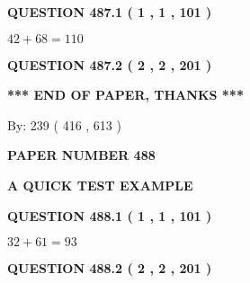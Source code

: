 \documentclass[12pt]{article}
\begin{document}
\vspace{0.2in}
  
{\textbf{\Large{QUESTION
487.1 
 ( 1 , 1 , 101 )
}}}
  
  
 
 

$ %
42 +  %
68=   %
110$
 
 
  
\vspace{0.2in}
  
{\textbf{\Large{QUESTION
487.2 
 ( 2 , 2 , 201 )
}}}
  
  
   
   
 \vspace{0.2in}
 
   
   
   
   
\vspace{1.0in} 
{\textbf{\large{ *** END OF PAPER, THANKS *** }}} 
   
   
\hspace{1.0in} By: 
 239 ( 416 ,  613 )
   
   
   
   
\newpage 
\setcounter{page}{ 
   488001 } 
   
   
   
   
 {\textbf{ \Large{ PAPER NUMBER  488  }}}
   
   
\vspace{0.2in}
   
   
   
   
   
   
 \vspace{0.2in}
{\LARGE {\textbf{ A QUICK TEST EXAMPLE}}}
   
   
  
\vspace{0.2in}
  
{\textbf{\Large{QUESTION
488.1 
 ( 1 , 1 , 101 )
}}}
  
  
 
 

$ %
32 +  %
61=   %
93$
 
 
  
\vspace{0.2in}
  
{\textbf{\Large{QUESTION
488.2 
 ( 2 , 2 , 201 )
}}}
  
  
   
   
 \vspace{0.2in}
 
\end{document}
